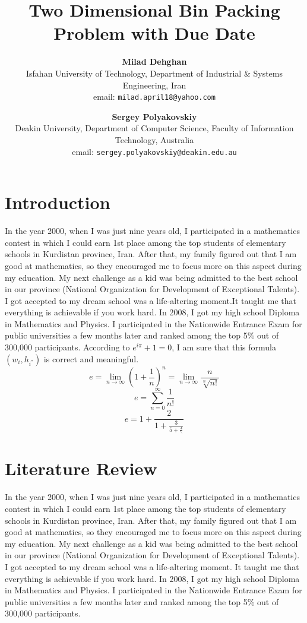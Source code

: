 \documentclass[11pt,a4paper,twocolumn]{article}
\title{\textbf{Two Dimensional Bin Packing Problem with Due Date}}
\author{\textbf{Milad Dehghan}\\
Isfahan University of Technology, Department of Industrial \& Systems Engineering, Iran\\
email: \texttt{milad.april18@yahoo.com}\\
\and\textbf{Sergey Polyakovskiy}\\
Deakin University, Department of Computer Science, Faculty of Information Technology, Australia\\
email: \texttt{sergey.polyakovskiy@deakin.edu.au}
}
\date{}
\begin{document}
\maketitle

\section{Introduction}\label{section.intro}

In the year 2000, when I was just nine years old, I participated in a mathematics contest in which I could earn 1st place among the top students of elementary schools in Kurdistan province, Iran. After that, my family figured out that I am good at mathematics, so they encouraged me to focus more on this aspect during my education. My next challenge as a kid was being admitted to the best school in our province (National Organization for Development of Exceptional Talents). I got accepted to my dream school was a life-altering moment.It taught me that everything is achievable if you work hard. In 2008, I got my high school Diploma in Mathematics and Physics. I participated in the Nationwide Entrance Exam for public universities a few months later and ranked among the top 5\% out of 300,000 participants. According to $e^{i\pi}+1=0$, I am sure that this formula$ (w_{i},h_{i^{*}})$ is correct and meaningful. $$e=\lim_{n\to\infty} \left(1+\frac{1}{n}\right)^n=\lim_{n\to\infty}\frac{n}{\sqrt[n]{n!}} $$
\begin{equation}e=\sum_{n=0}^{\infty}\frac{1}{n!}\end{equation}
\begin{equation}e=1+\frac{2}{1+\frac{3}{5+\frac{4}{\ddots}}}\end{equation}

\section{Literature Review}\label{section.litre}
In the year 2000, when I was just nine years old, I participated in a mathematics contest in which I could earn 1st place among the top students of elementary schools in Kurdistan province, Iran. After that, my family figured out that I am good at mathematics, so they encouraged me to focus more on this aspect during my education. My next challenge as a kid was being admitted to the best school in our province (National Organization for Development of Exceptional Talents). I got accepted to my dream school was a life-altering moment. It taught me that everything is achievable if you work hard. In 2008, I got my high school Diploma in Mathematics and Physics. I participated in the Nationwide Entrance Exam for public universities a few months later and ranked among the top 5\% out of 300,000 participants.
\end{document}
